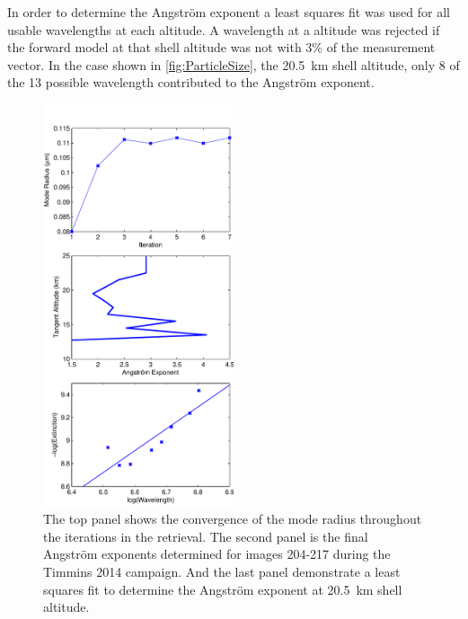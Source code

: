 In order to determine the Angstr\"{o}m exponent a least squares fit was used for all usable wavelengths at each altitude. A wavelength at a altitude was rejected if the forward model at that shell altitude was not with 3\% of the measurement vector. In the case shown in \autoref{fig:ParticleSize}, the 20.5~km shell altitude, only 8 of the 13 possible wavelength contributed to the Angstr\"{o}m exponent. 

\begin{figure}
\centering
\includegraphics[width=0.5\textwidth]{./Images/5-4-ParticelSize.pdf}
    \caption[TODO:Write This]{The top panel shows the convergence of the mode radius throughout the iterations in the retrieval. The second panel is the final Angstr\"{o}m exponents determined for images 204-217 during the Timmins 2014 campaign. And the last panel demonstrate a least squares fit to determine the Angstr\"{o}m exponent at 20.5~km shell altitude.}
    \label{fig:5.4:ParticleSize}
\end{figure}